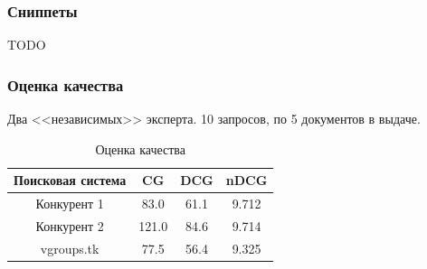 \documentclass{beamer}
\begin{document}
\begin{frame}
  \frametitle{Сниппеты}
    TODO
\end{frame}

\begin{frame}
  \frametitle{Оценка качества}
    Два <<независимых>> эксперта. 10 запросов, по 5 документов в выдаче.
    \begin{center}
    \begin{table}[!htb]
      \begin{tabu}{|c|c|c|c|}
        \hline
        Поисковая система & CG    & DCG     & nDCG \\ \hline
        Конкурент 1       & 83.0  &  61.1   & 9.712  \\ \hline
        Конкурент 2       & 121.0 &  84.6   & 9.714   \\ \hline
        vgroups.tk        & 77.5  &  56.4   & 9.325   \\ \hline
      \end{tabu}
    \caption{Оценка качества}
    \end{table}
  \end{center}
\end{frame}
\end{document}
